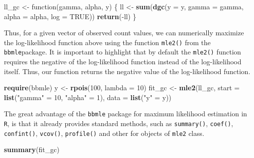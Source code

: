 \documentclass[9pt,a5paper,]{book}
\newenvironment{Shaded}{}{}
\newcommand{\KeywordTok}[1]{\textbf{{#1}}}
\newcommand{\DataTypeTok}[1]{\underline{{#1}}}
\newcommand{\DecValTok}[1]{{#1}}
\newcommand{\StringTok}[1]{{#1}}
\newcommand{\OtherTok}[1]{{#1}}
\newcommand{\NormalTok}[1]{{#1}}
\renewenvironment{Shaded}{\color{inputcolor}}{}
\renewcommand{\DataTypeTok}[1]{{#1}}
\theoremstyle{definition}
\theoremstyle{definition}
\theoremstyle{remark}
\begin{document}
\begin{Shaded}
\begin{Highlighting}[]
\NormalTok{ll_gc <-}\StringTok{ }\NormalTok{function(gamma, alpha, y) \{}
  \NormalTok{ll <-}\StringTok{ }\KeywordTok{sum}\NormalTok{(}\KeywordTok{dgc}\NormalTok{(}\DataTypeTok{y =} \NormalTok{y, }\DataTypeTok{gamma =} \NormalTok{gamma, }\DataTypeTok{alpha =} \NormalTok{alpha, }\DataTypeTok{log =} \OtherTok{TRUE}\NormalTok{))}
  \KeywordTok{return}\NormalTok{(-ll)}
\NormalTok{\}}
\end{Highlighting}
\end{Shaded}

Thus, for a given vector of observed count values, we can numerically
maximize the log-likelihood function above using the function
\texttt{mle2()} from the \texttt{bbmle}package. It is important to
highlight that by default the \texttt{mle2()} function requires the
negative of the log-likelihood function instead of the log-likelihood
itself. Thus, our function returns the negative value of the
log-likelihood function.

\begin{Shaded}
\begin{Highlighting}[]
\KeywordTok{require}\NormalTok{(bbmle)}
\NormalTok{y <-}\StringTok{ }\KeywordTok{rpois}\NormalTok{(}\DecValTok{100}\NormalTok{, }\DataTypeTok{lambda =} \DecValTok{10}\NormalTok{)}
\NormalTok{fit_gc <-}\StringTok{ }\KeywordTok{mle2}\NormalTok{(ll_gc, }\DataTypeTok{start =} \KeywordTok{list}\NormalTok{(}\StringTok{"gamma"} \NormalTok{=}\StringTok{ }\DecValTok{10}\NormalTok{, }\StringTok{"alpha"} \NormalTok{=}\StringTok{ }\DecValTok{1}\NormalTok{),}
               \DataTypeTok{data =} \KeywordTok{list}\NormalTok{(}\StringTok{"y"} \NormalTok{=}\StringTok{ }\NormalTok{y))}
\end{Highlighting}
\end{Shaded}

The great advantage of the \texttt{bbmle} package for maximum likelihood
estimation in \texttt{R}, is that it already provides standard methods,
such as \texttt{summary()}, \texttt{coef()}, \texttt{confint()},
\texttt{vcov()}, \texttt{profile()} and other for objects of
\texttt{mle2} class.

\begin{Shaded}
\begin{Highlighting}[]
\KeywordTok{summary}\NormalTok{(fit_gc)}
\end{Highlighting}
\end{Shaded}
\end{document}
